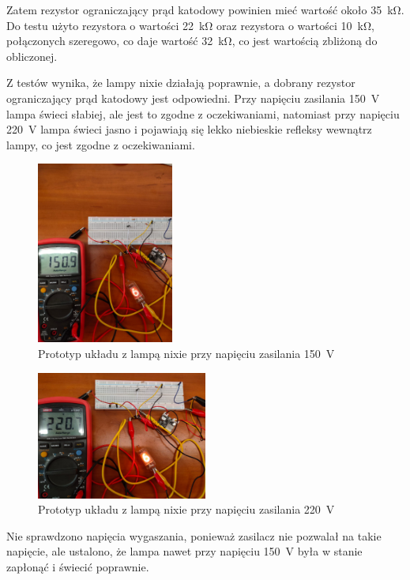 \documentclass[../main.tex]{subfiles}
\begin{document}
Zatem rezystor ograniczający prąd katodowy powinien mieć wartość około \SI{35}{\kilo\ohm}.
Do testu użyto rezystora o wartości \SI{22}{\kilo\ohm} oraz rezystora o wartości \SI{10}{\kilo\ohm}, połączonych
szeregowo, co daje wartość \SI{32}{\kilo\ohm}, co jest wartością zbliżoną do obliczonej.


Z testów wynika, że lampy nixie działają poprawnie, a dobrany rezystor ograniczający prąd katodowy jest odpowiedni. 
Przy napięciu zasilania \SI{150}{\volt} lampa świeci słabiej, ale jest to zgodne z oczekiwaniami,
natomiast przy napięciu \SI{220}{\volt} lampa świeci jasno i pojawiają się lekko niebieskie refleksy wewnątrz lampy, co jest zgodne z oczekiwaniami.

\begin{figure}[H]
    \centering
    \includegraphics[width=0.4\textwidth]{nixie150V.jpeg}
    \caption{Prototyp układu z lampą nixie przy napięciu zasilania \SI{150}{\volt}}
\end{figure}


\begin{figure}[H]
    \centering
    \includegraphics[width=0.5\textwidth]{nixie220V.jpeg}
    \caption{Prototyp układu z lampą nixie przy napięciu zasilania \SI{220}{\volt}}
\end{figure}

Nie sprawdzono napięcia wygaszania, ponieważ zasilacz nie pozwalał na takie napięcie, 
ale ustalono, że lampa nawet przy napięciu \SI{150}{\volt} była w stanie zapłonąć i świecić poprawnie.
\end{document}
